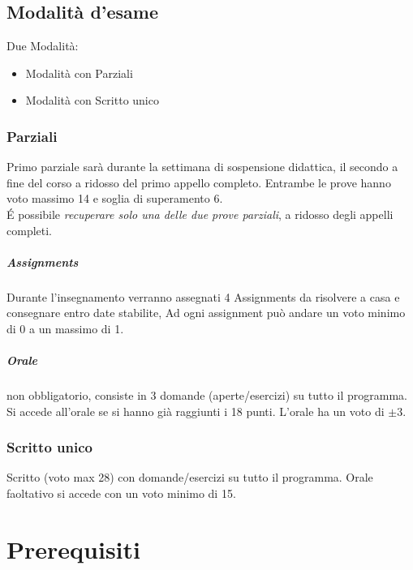 \documentclass[12pt, a4paper, openany]{book}
\begin{document}
\section{Modalità d'esame}
Due Modalità:
\begin{itemize}
    \item Modalità con Parziali
    \item Modalità con Scritto unico
\end{itemize}

\subsection*{Parziali}
Primo parziale sarà durante la settimana di sospensione didattica, il secondo a fine del corso a ridosso del primo appello completo.
Entrambe le prove hanno voto massimo 14 e soglia di superamento 6.
\\É possibile \emph{recuperare solo una delle due prove parziali}, a ridosso degli appelli completi.
\paragraph*{Assignments} Durante l'insegnamento verranno assegnati 4 Assignments da risolvere a casa e consegnare entro date stabilite,
Ad ogni assignment può andare un voto minimo di 0 a un massimo di 1.
\paragraph*{Orale} non obbligatorio, consiste in 3 domande (aperte/esercizi) su tutto il programma.
Si accede all'orale se si hanno già raggiunti i 18 punti. L'orale ha un voto di $\pm 3$.

\subsection*{Scritto unico}
Scritto (voto max 28) con domande/esercizi su tutto il programma.
Orale faoltativo si accede con un voto minimo di 15.



\chapter{Prerequisiti}
\end{document}
